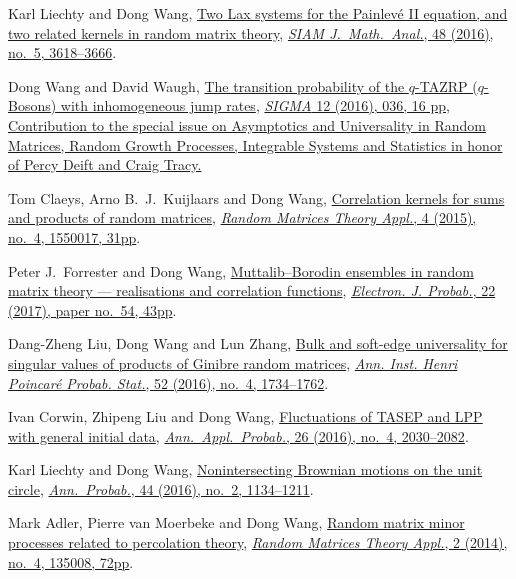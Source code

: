 \begin{etaremune}
  Karl Liechty and Dong Wang, \href{http://arxiv.org/abs/1601.01603}{Two Lax systems for the Painlev\'{e} II equation, and two related kernels in random matrix theory}, \href{https://doi.org/10.1137/16M1056080}{\textit{SIAM J.\ Math.\ Anal.}, 48 (2016), no.\ 5, 3618--3666}.
\item
  Dong Wang and David Waugh, \href{http://arxiv.org/abs/1512.01612}{The transition probability of the $q$-TAZRP ($q$-Bosons) with inhomogeneous jump rates}, \href{https://doi.org/10.3842/SIGMA.2016.037}{\textit{SIGMA} 12 (2016), 036, 16 pp, Contribution to the special issue on Asymptotics and Universality in Random Matrices, Random Growth Processes, Integrable Systems and Statistics in honor of Percy Deift and Craig Tracy.}
\item 
  Tom Claeys, Arno B.~J.~Kuijlaars and Dong Wang, \href{http://arxiv.org/abs/1505.00610}{Correlation kernels for sums and products of random matrices}, \href{https://doi.org/10.1142/S2010326315500173}{\textit{Random Matrices Theory Appl.}, 4 (2015), no.\ 4, 1550017, 31pp}.
\item
  Peter J.~Forrester and Dong Wang, \href{http://arxiv.org/abs/1502.07147}{Muttalib--Borodin ensembles in random matrix theory --- realisations and correlation functions}, \href{https://doi.org/10.1214/17-EJP62}{\textit{Electron. J. Probab.}, 22 (2017), paper no.\ 54, 43pp}.
\item
  Dang-Zheng Liu, Dong Wang and Lun Zhang, \href{http://arxiv.org/abs/1412.6777}{Bulk and soft-edge universality for singular values of products of Ginibre random matrices}, \href{https://doi.org/10.1214/15-AIHP696}{\textit{Ann. Inst. Henri Poincar\'e Probab. Stat.}, 52 (2016), no.\ 4, 1734--1762}.
\item
  Ivan Corwin, Zhipeng Liu and Dong Wang, \href{http://arxiv.org/abs/1412.5087}{Fluctuations of TASEP and LPP with general initial data}, \href{https://doi.org/10.1214/15-AAP1139}{\textit{Ann.\ Appl.\ Probab.}, 26 (2016), no.\ 4, 2030--2082}.
\item
  Karl Liechty and Dong Wang, \href{http://arxiv.org/abs/1312.7390}{Nonintersecting Brownian motions on the unit circle}, \href{https://doi.org/10.1214/14-AOP998}{\textit{Ann.\ Probab.}, 44 (2016), no.\ 2, 1134--1211}.
\item 
  Mark Adler, Pierre van Moerbeke and Dong Wang,
  \href{http://arxiv.org/abs/1301.7017}{Random matrix minor processes related to percolation theory}, \href{https://doi.org/10.1142/S2010326313500081}{\textit{Random Matrices Theory Appl.}, 2 (2014), no.\ 4, 135008, 72pp}.

\end{etaremune}
